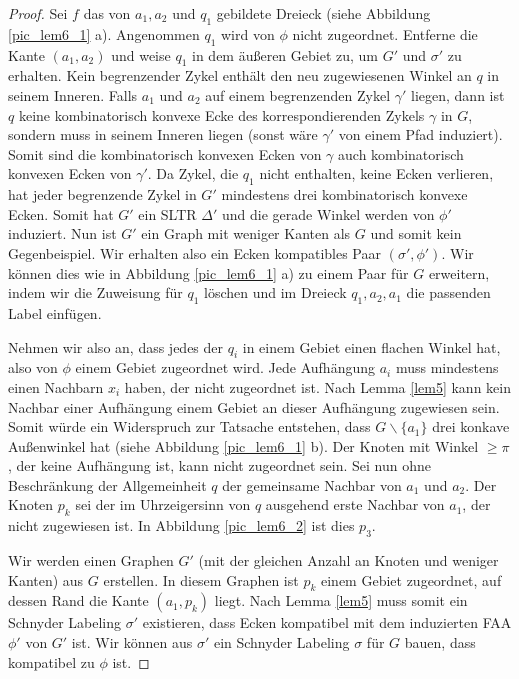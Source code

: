 \begin{proof}
Sei $f$ das von $a_1,a_2$ und $q_1$ gebildete Dreieck (siehe Abbildung \ref{pic_lem6_1} a). Angenommen $q_1$ wird von $\phi$ nicht zugeordnet. Entferne die Kante $(a_1,a_2)$ und weise $q_1$ in dem äußeren Gebiet zu, um $G'$ und $\sigma'$ zu erhalten. Kein begrenzender Zykel enthält den neu zugewiesenen Winkel an $q$ in seinem Inneren. Falls $a_1$ und $a_2$ auf einem begrenzenden Zykel $\gamma'$ liegen, dann ist $q$ keine kombinatorisch konvexe Ecke des korrespondierenden Zykels $\gamma$ in $G$, sondern muss in seinem Inneren liegen (sonst wäre $\gamma'$ von einem Pfad induziert). Somit sind die kombinatorisch konvexen Ecken von $\gamma$ auch kombinatorisch konvexen Ecken von $\gamma'$. Da Zykel, die $q_1$ nicht enthalten, keine Ecken verlieren, hat jeder begrenzende Zykel in $G'$ mindestens drei kombinatorisch konvexe Ecken. Somit hat $G'$ ein SLTR $\Delta'$ und die gerade Winkel werden von $\phi'$ induziert. Nun ist $G'$ ein Graph mit weniger Kanten als $G$ und somit kein Gegenbeispiel. Wir erhalten also ein Ecken kompatibles Paar $(\sigma',\phi')$. Wir können dies wie in Abbildung \ref{pic_lem6_1} a) zu einem Paar für $G$ erweitern, indem wir die Zuweisung für $q_1$ löschen und im Dreieck $q_1,a_2,a_1$ die passenden Label einfügen.

Nehmen wir also an, dass jedes der $q_i$ in einem Gebiet einen flachen Winkel hat, also von $\phi$ einem Gebiet zugeordnet wird. Jede Aufhängung $a_i$ muss mindestens einen Nachbarn $x_i$ haben, der nicht zugeordnet ist. Nach Lemma \ref{lem5} kann kein Nachbar einer Aufhängung einem Gebiet an dieser Aufhängung zugewiesen sein. Somit würde ein Widerspruch zur Tatsache entstehen, dass $G\backslash \{a_1\}$ drei konkave Außenwinkel hat (siehe Abbildung \ref{pic_lem6_1} b). Der Knoten mit Winkel $\geq \pi$, der keine Aufhängung ist, kann nicht zugeordnet sein. Sei nun ohne Beschränkung der Allgemeinheit $q$ der gemeinsame Nachbar von $a_1$ und $a_2$. Der Knoten $p_k$ sei der im Uhrzeigersinn von $q$ ausgehend erste Nachbar von $a_1$, der nicht zugewiesen ist. In Abbildung \ref{pic_lem6_2} ist dies $p_3$.

Wir werden einen Graphen $G'$ (mit der gleichen Anzahl an Knoten und weniger Kanten) aus $G$ erstellen. In diesem Graphen ist $p_k$ einem Gebiet zugeordnet, auf dessen Rand die Kante $(a_1,p_k)$ liegt. Nach Lemma \ref{lem5} muss somit ein Schnyder Labeling $\sigma'$ existieren, dass Ecken kompatibel mit dem induzierten FAA $\phi'$ von $G'$ ist. Wir können aus $\sigma'$ ein Schnyder Labeling $\sigma$ für $G$ bauen, dass kompatibel zu $\phi$ ist.


\end{proof}
